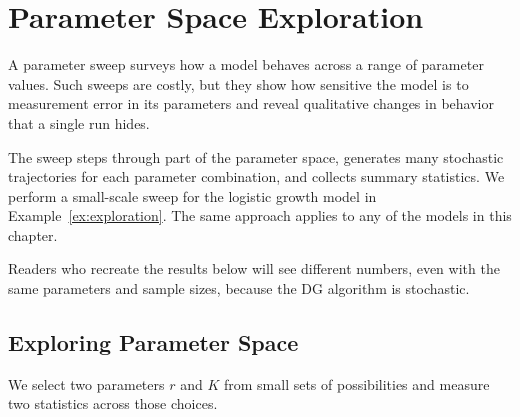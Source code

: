 \section{Parameter Space Exploration}\label{sec:parameter_sweep}


A parameter sweep surveys how a model behaves across a range of parameter values. Such sweeps are costly, but they show how sensitive the model is to measurement error in its parameters and reveal qualitative changes in behavior that a single run hides.

The sweep steps through part of the parameter space, generates many stochastic trajectories for each parameter combination, and collects summary statistics. We perform a small-scale sweep for the logistic growth model in Example~\ref{ex:exploration}. The same approach applies to any of the models in this chapter.

Readers who recreate the results below will see different numbers, even with the same parameters and sample sizes, because the DG algorithm is stochastic.


\subsection{Exploring Parameter Space}\label{subsec:exploring_parameter_space}


We select two parameters $r$ and $K$ from small sets of possibilities and measure two statistics across those choices.

